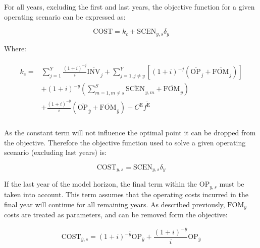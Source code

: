 \documentclass{article}
\newcommand{\sYears}{Y}
\newcommand{\sScenarios}{S}
\newcommand{\iYear}{y}
\newcommand{\iYearTerminal}{\overline{\iYear}}
\newcommand{\iYearAlias}{j}
\newcommand{\iScenario}{s}
\newcommand{\iScenarioAlias}{m}
\newcommand{\cOperatingCost}[1][\iYear,\iScenario]{\mathrm{OP}_{#1}}
\newcommand{\cFixedOperationsMaintenanceCost}[1][\iYear]{\mathrm{FOM}_{#1}}
\newcommand{\cInvestmentCost}[1][\iYear]{\mathrm{INV}_{#1}}
\newcommand{\cInterestRate}{i}
\newcommand{\cEmissionsTargetViolationPenalty}{C^{\mathrm{E}}}
\newcommand{\cObjectiveFunction}{\mathrm{COST}}
\newcommand{\cOperatingCostScenario}[1][\iYear,\iScenario]{\mathrm{SCEN}_{#1}}
\newcommand{\cDiscountRate}[1][\iYear]{\delta_{#1}}
\newcommand{\vEmissionsTargetViolation}{f^{\mathrm{E}}}
\begin{document}
For all years, excluding the first and last years, the objective function for a given operating scenario can be expressed as:

\begin{equation}
	\cObjectiveFunction = k_{c} + \cOperatingCostScenario\cDiscountRate
\end{equation}

Where:

\begin{align}
\begin{split}
	k_{c} = & \sum\limits_{\iYearAlias=1}^{\sYears} \frac{(1+\cInterestRate)^{-\iYearAlias}}{\cInterestRate}\overline{\cInvestmentCost[]}_{\iYearAlias} + \sum\limits_{\iYearAlias=1, \iYearAlias \neq \iYear}^{\sYears} \left[(1+\cInterestRate)^{-\iYearAlias} (\overline{\cOperatingCost[]}_{\iYearAlias} + \overline{\cFixedOperationsMaintenanceCost[]}_{\iYearAlias}) \right]\\
	& + (1 + \cInterestRate)^{-\iYear}\left(\sum\limits_{\iScenarioAlias = 1,\iScenarioAlias\neq \iScenario}^{\sScenarios}\overline{\cOperatingCostScenario[]}_{\iYear,\iScenarioAlias} + \overline{\cFixedOperationsMaintenanceCost[]}_{\iYear}\right)\\
	& + \frac{(1+\cInterestRate)^{-\iYearTerminal}}{\cInterestRate} \left(\overline{\cOperatingCost[]}_{\iYearTerminal} + \overline{\cFixedOperationsMaintenanceCost[]}_{\iYearTerminal} \right) + \cEmissionsTargetViolationPenalty \overline{\vEmissionsTargetViolation}\\
\end{split}
\end{align}

As the constant term will not influence the optimal point it can be dropped from the objective. Therefore the objective function used to solve a given operating scenario (excluding last years) is:

\begin{equation}
	\cObjectiveFunction_{\iYear,\iScenario} = \cOperatingCostScenario\cDiscountRate
\end{equation}

If the last year of the model horizon, the final term within the $\cOperatingCost$ must be taken into account. This term assumes that the operating costs incurred in the final year will continue for all remaining years. As described previously, $\cFixedOperationsMaintenanceCost$ costs are treated as parameters, and can be removed form the objective:

\begin{equation}
	\cObjectiveFunction_{\iYearTerminal,\iScenario} = (1+\cInterestRate)^{-\iYearTerminal} \cOperatingCost[\iYearTerminal] + \frac{(1+\cInterestRate)^{-\iYearTerminal}}{\cInterestRate} \cOperatingCost[\iYearTerminal]
\end{equation}
\end{document}
